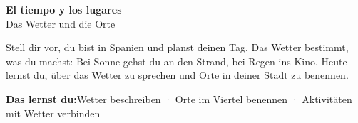 \documentclass[11pt, a4paper]{article}
\newcommand{\thema}{El tiempo y los lugares}
\newcommand{\untertitel}{Das Wetter und die Orte}
\newcommand{\lernziele}{Wetter beschreiben · Orte im Viertel benennen · Aktivitäten mit Wetter verbinden}
\begin{document}
\begin{center}
    {\LARGE\bfseries \thema}\\[3pt]
    {\small \untertitel}
\end{center}

\vspace{4pt}

Stell dir vor, du bist in Spanien und planst deinen Tag.
Das Wetter bestimmt, was du machst: Bei Sonne gehst du an den Strand, bei Regen ins Kino.
Heute lernst du, über das Wetter zu sprechen und Orte in deiner Stadt zu benennen.

\vspace{2pt}

\begin{lernzielbox}
\textbf{Das lernst du:}\quad \lernziele
\end{lernzielbox}

\end{document}
